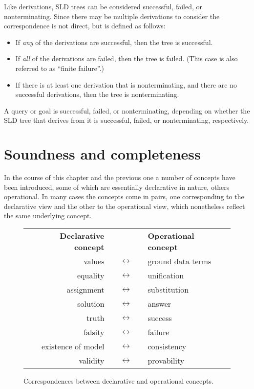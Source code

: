 Like derivations,
SLD trees can be considered successful, failed, or nonterminating.
Since there may be multiple derivations to consider
the correspondence is not direct,
but is defined as follows:
\begin{itemize}
\item
If \emph{any} of the derivations are successful,
then the tree is successful\label{gi:success2}.
\item
If \emph{all} of the derivations are failed,
then the tree is failed\label{gi:failure2}.
(This case is also referred to as ``finite failure''.)
\item
If there is at least one derivation that is nonterminating,
and there are no successful derivations,
then the tree is nonterminating\label{gi:nontermination2}.
\end{itemize}
A query or goal is successful, failed, or nonterminating,
depending on whether the SLD tree that derives from it
is successful, failed, or nonterminating,
respectively.



\section{Soundness and completeness}
\label{sec:meta}

In the course of this chapter and the previous one
a number of concepts have been introduced,
some of which are essentially declarative in nature,
others operational.
In many cases the concepts come in pairs,
one corresponding to the declarative view
and the other to the operational view,
which nonetheless reflect the same underlying concept.

\begin{figure}
\begin{center}
\begin{tabular}{rcl}
\bf{Declarative concept} & & \bf{Operational concept} \\[1em]
values & $\quad\longleftrightarrow\quad$ & ground data terms \\
equality & $\quad\longleftrightarrow\quad$ & unification \\
assignment & $\quad\longleftrightarrow\quad$ & substitution \\
solution & $\quad\longleftrightarrow\quad$ & answer \\
truth & $\quad\longleftrightarrow\quad$ & success \\
falsity & $\quad\longleftrightarrow\quad$ & failure \\
existence of model & $\quad\longleftrightarrow\quad$ & consistency \\
validity & $\quad\longleftrightarrow\quad$ & provability
\end{tabular}
\end{center}
\caption{
Correspondences between declarative and operational concepts.
\label{fig:correspondence}
}
\end{figure}

